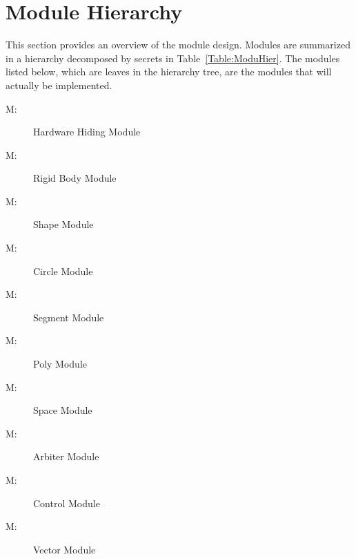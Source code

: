 \documentclass[12pt]{article}
\newcounter{modnum}
\newcommand{\mthemodnum}{M\themodnum}
\begin{document}
\section{Module Hierarchy}
\label{Sec:ModuHier}
This section provides an overview of the module design. Modules are summarized in a hierarchy decomposed by secrets in Table~\ref{Table:ModuHier}. The modules listed below, which are leaves in the hierarchy tree, are the modules that will actually be implemented.
\begin{description}
\item[\mthemodnum\label{MhwHiding}:]Hardware Hiding Module
\end{description}
\begin{description}
\item[\mthemodnum\label{Mmodbodyserv}:]Rigid Body Module
\end{description}
\begin{description}
\item[\mthemodnum\label{Mmodshapeserv}:]Shape Module
\end{description}
\begin{description}
\item[\mthemodnum\label{Mmodcircleserv}:]Circle Module
\end{description}
\begin{description}
\item[\mthemodnum\label{Mmodsegmentserv}:]Segment Module
\end{description}
\begin{description}
\item[\mthemodnum\label{Mmodpolyserv}:]Poly Module
\end{description}
\begin{description}
\item[\mthemodnum\label{Mmodspaceserv}:]Space Module
\end{description}
\begin{description}
\item[\mthemodnum\label{Mmodarbiterserv}:]Arbiter Module
\end{description}
\begin{description}
\item[\mthemodnum\label{MmodControl}:]Control Module
\end{description}
\begin{description}
\item[\mthemodnum\label{Mmodvectorserv}:]Vector Module
\end{description}
\end{document}
